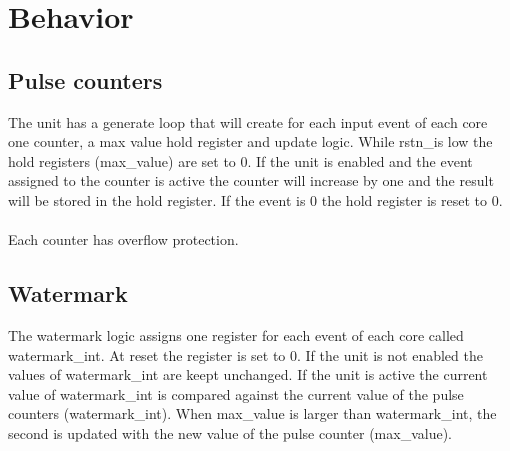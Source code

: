\section{Behavior}\label{behavior}

\subsection{Pulse counters}
The unit has a generate loop that will create for each input event of each core one counter, a max value hold register and update logic. While rstn\_is low the hold registers (max\_value) are set to 0.
If the unit is enabled and the event assigned to the counter is active the counter will increase by one and the result will be stored in the hold register. If the event is 0 the hold register is reset to 0.\\
\\
Each counter has overflow protection.

\subsection{Watermark}
The watermark logic assigns one register for each event of each core called watermark\_int. At reset the register is set to 0. If the unit is not enabled the values of watermark\_int are keept unchanged. If the unit is active the current value of  watermark\_int is compared against the current value of the pulse counters (watermark\_int). When max\_value is larger than watermark\_int, the second is updated with the new value of the pulse counter (max\_value).\\
\\ 

